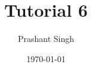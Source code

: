 \documentclass[11pt]{article}
\begin{document}
	\title{Tutorial 6}
	\author{Prashant Singh}
	\date{\today}
	\maketitle
\end{document}
